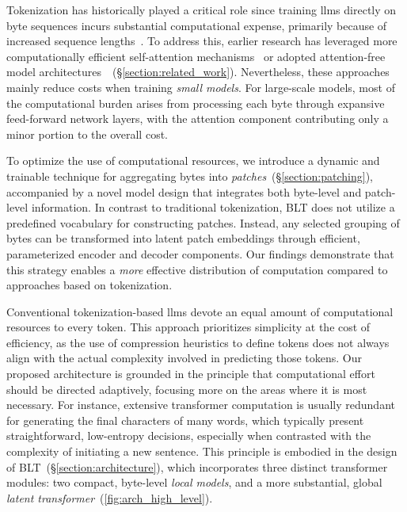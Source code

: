 Tokenization has historically played a critical role since training llms directly on byte sequences incurs substantial computational expense, primarily because of increased sequence lengths~\citep{xue2022byt5}. To address this, earlier research has leveraged more computationally efficient self-attention mechanisms~\citep{el2020characterbert, clark2022canine} or adopted attention-free model architectures~\citep{wang2024mambabyte}~(\S\ref{section:related_work}). Nevertheless, these approaches mainly reduce costs when training \textit{small models}. For large-scale models, most of the computational burden arises from processing each byte through expansive feed-forward network layers, with the attention component contributing only a minor portion to the overall cost.

To optimize the use of computational resources, we introduce a dynamic and trainable technique for aggregating bytes into \textit{patches}~(\S\ref{section:patching}), accompanied by a novel model design that integrates both byte-level and patch-level information. In contrast to traditional tokenization, {\textsc BLT} does not utilize a predefined vocabulary for constructing patches. Instead, any selected grouping of bytes can be transformed into latent patch embeddings through efficient, parameterized encoder and decoder components. Our findings demonstrate that this strategy enables a \textit{more} effective distribution of computation compared to approaches based on tokenization.

Conventional tokenization-based llms devote an equal amount of computational resources to every token. This approach prioritizes simplicity at the cost of efficiency, as the use of compression heuristics to define tokens does not always align with the actual complexity involved in predicting those tokens. Our proposed architecture is grounded in the principle that computational effort should be directed adaptively, focusing more on the areas where it is most necessary. For instance, extensive transformer computation is usually redundant for generating the final characters of many words, which typically present straightforward, low-entropy decisions, especially when contrasted with the complexity of initiating a new sentence. This principle is embodied in the design of {\textsc BLT}~(\S\ref{section:architecture}), which incorporates three distinct transformer modules: two compact, byte-level \textit{local models}, and a more substantial, global \textit{latent transformer}~(\autoref{fig:arch_high_level}). 

